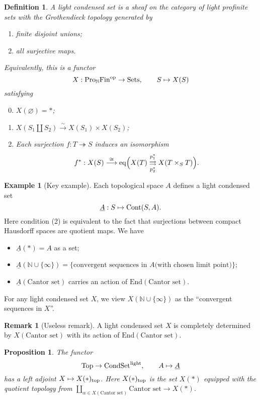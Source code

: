 \documentclass[12pt,a4paper]{amsart}
\newtheorem{prop}[PARA]{Proposition}
\newtheorem{defi}[PARA]{Definition}
\theoremstyle{definition}
\newtheorem{remark}[PARA]{Remark}
\theoremstyle{theorem}
\newtheorem{example}[PARA]{Example}
\newcommand{\N}{{\mathbb{N}}}
\newcommand{\End}{\mathrm{ End}}          %
\newcommand{\ul}{\underline}
\newcommand{\Cont}{{\rm Cont}}
\begin{document}
\begin{defi}
A {\em light condensed set} is a sheaf on the category of light
profinite sets with the Grothendieck topology generated by
\begin{enumerate}
\item finite disjoint unions;
\item {\em all} surjective maps.
\end{enumerate}
Equivalently, this is a functor 
$$
  X: \text{Pro}_\N\text{Fin}^{\rm op} \to \text{Sets},\qquad S\mapsto X(S)
$$
satisfying
\begin{enumerate}
\setcounter{enumi}{-1}
\item $X(\varnothing)=*$;
\item $X(S_1\amalg S_2)\stackrel{\sim}\longrightarrow X(S_1)\times X(S_2)$;
\item Each surjection $f:T\twoheadrightarrow S$ induces an isomorphism
$$
  f^*:X(S) \stackrel{\cong}\longrightarrow {\rm eq}\Bigl(X(T)
  \overset{p_1^*}{\underset{p_2^*}{\rightrightarrows}} X(T\times_ST)\Bigr).
$$
\end{enumerate}
\end{defi}

\begin{example}[Key example]
Each topological space $A$ defines a light condensed set 
$$
  \ul{A}: S\mapsto\Cont(S,A).
$$
Here condition (2) is equivalent to the fact that surjections between
compact Hausdorff spaces are quotient maps. We have
\begin{itemize}
\item $\ul{A}(*) = A$ as a set; 
\item $\ul{A}(\N\cup\{\infty\}) = \{\text{convergent sequences in $A$
  (with chosen limit point)}\}$;
\item $\ul{A}(\text{Cantor set})$ carries an action of
  $\End(\text{Cantor set})$. 
\end{itemize}
\end{example}

For any light condensed set $X$, we view $X(\N\cup\{\infty\})$ as the
``convergent sequences in $X$''. 

\begin{remark}[Useless remark]
A light condensed set $X$ is completely determined by $X(\text{Cantor
  set})$ with its action of $\End(\text{Cantor set})$.
\end{remark}

\begin{prop}
The functor
$$
  \text{Top} \to \text{CondSet}^{\rm light},\qquad A\mapsto\ul{A}
$$
has a left adjoint $X\mapsto X(*)_{\rm top}$. Here $X(*)_{\rm top}$ is
the set $X(*)$ equipped with the quotient topology from
$\coprod_{\alpha\in X(\text{Cantor set})}\text{Cantor set} \to X(*)$.
\end{prop}
\end{document}
